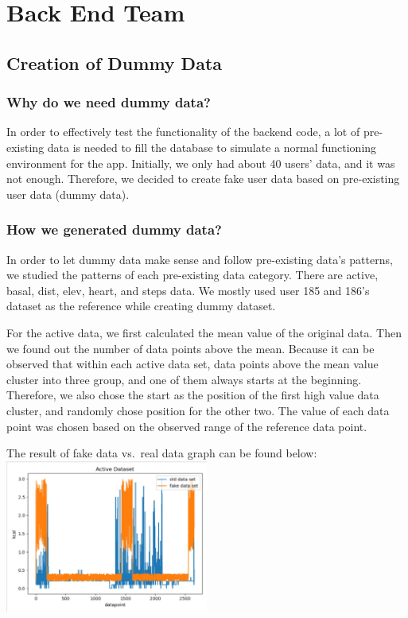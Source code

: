 \documentclass[]{book}
\begin{document}
\chapter{Back End Team}\label{back-end-team}

\section{Creation of Dummy Data}\label{creation-of-dummy-data}

\subsection{Why do we need dummy data?}\label{why-do-we-need-dummy-data}

In order to effectively test the functionality of the backend code, a
lot of pre-existing data is needed to fill the database to simulate a
normal functioning environment for the app. Initially, we only had about
40 users' data, and it was not enough. Therefore, we decided to create
fake user data based on pre-existing user data (dummy data).

\subsection{How we generated dummy
data?}\label{how-we-generated-dummy-data}

In order to let dummy data make sense and follow pre-existing data's
patterns, we studied the patterns of each pre-existing data category.
There are active, basal, dist, elev, heart, and steps data. We mostly
used user 185 and 186's dataset as the reference while creating dummy
dataset.

For the active data, we first calculated the mean value of the original
data. Then we found out the number of data points above the mean.
Because it can be observed that within each active data set, data points
above the mean value cluster into three group, and one of them always
starts at the beginning. Therefore, we also chose the start as the
position of the first high value data cluster, and randomly chose
position for the other two. The value of each data point was chosen
based on the observed range of the reference data point.

The result of fake data vs.~real data graph can be found below:\\
\includegraphics[width=0.50000\textwidth]{./images/Active Data.JPG}
\end{document}

